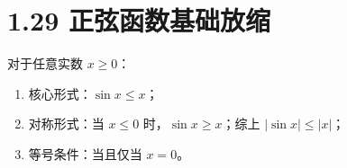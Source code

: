 \documentclass{article}
\begin{document}
\section*{1.29 正弦函数基础放缩}
对于任意实数 \( x \geq 0 \)：
\begin{enumerate}
    \item 核心形式：\( \sin x \leq x \)；
    \item 对称形式：当 \( x \leq 0 \) 时，\( \sin x \geq x \)；综上 \( |\sin x| \leq |x| \)；
    \item 等号条件：当且仅当 \( x=0 \)。
\end{enumerate}
\end{document}
